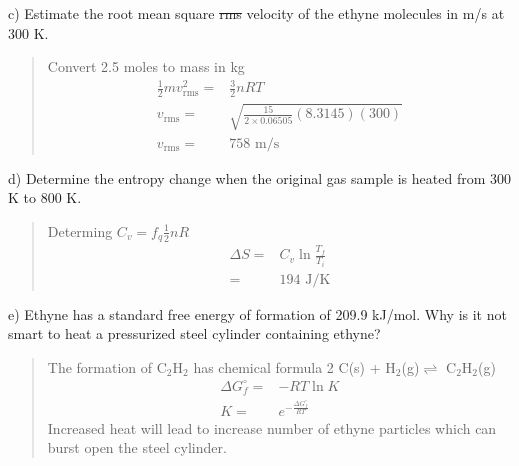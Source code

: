 \documentclass[11pt]{article}
\newcommand{\brian}[1]{
  {\begin{quote}
      \color{blue} #1
  \end{quote}}
}
\begin{document}
c) Estimate the {\color{blue} root mean square} {\color{red} \sout{rms}} velocity of the ethyne
molecules in m/s at 300 K.

\brian{Convert 2.5 moles to mass in kg
  \begin{align*}
    \frac{1}{2}mv^2_\text{rms} = & \frac{3}{2}nRT \\
    v_\text{rms} = & \sqrt{\frac{15}{2\times 0.06505}(8.3145)(300)} \\
    v_\text{rms} = & 758 \text{ m/s}
  \end{align*}
}

d) Determine the entropy change when the original gas sample is heated from 300 K to
800 K.

\brian{Determing $C_v = f_q\frac{1}{2}nR$
  \begin{align*}
    \Delta S = & C_v\ln\frac{T_f}{T_i} \\
    = & 194 \text{ J/K}
  \end{align*}
}

e) Ethyne has a standard free energy of formation of 209.9 kJ/mol. Why is it not smart
to heat a pressurized steel cylinder containing ethyne?

\brian{The formation of C$_2$H$_2$ has chemical formula 2 C(s) + H$_2$(g)$\rightleftharpoons$ C$_2$H$_2$(g)
  \begin{align*}
    \Delta G^\circ_f = & -RT\ln K \\
    K = & e^{-\frac{\Delta G^\circ_f}{RT}}
  \end{align*}
  Increased heat will lead to increase number of ethyne particles which can burst open
  the steel cylinder.
}
\end{document}
